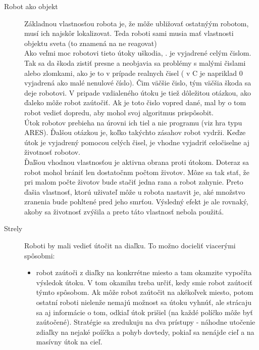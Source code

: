 \begin{description}
\item[Robot ako objekt]\hfill %
Základnou vlastnosťou robota je, že môže ubližovať ostatnýým robotom, musí ich najskôr lokalizovat. Teda roboti sami musia mať vlastnosti objektu sveta (to znamená na ne reagovat) \\ %
Ako veľmi moc robotovi tieto útoky uškodia, . je vyjadrené celým čislom. Tak sa da  škoda zistiť presne a neobjavia sa problémy s malými čislami alebo zlomkami, ako je to v prípade realnych čisel ( v C je napriklad 0 vyjadrená ako malé nenulové číslo). Čim väčšie čislo, tým väčšia škoda sa deje robotovi. V pripade vzdialeného útoku je tiež dôležitou otázkou, ako ďaleko môže robot zaútočiť. Ak je toto čislo vopred dané, mal by o tom robot vedieť dopredu, aby mohol svoj algoritmus prispôsobit.\\
Útok robotov prebieha na úrovni ich tiel a nie programu (viz hra typu ARES). Ďalšou  otázkou je, koľko takýchto zásahov robot vydrži. Keďze útok je vyjadrený pomocou celých čisel,  je vhodne vyjadriť celočiselne  aj životnosť robotov.\\
Ďaľšou vhodnou vlastnosťou je aktivna obrana proti útokom. Doteraz sa robot mohol brániť len dostatočnm počtom životov. Môze sa tak stať, že pri malom počte životov bude stačiť jedna rana a robot zahynie. Preto ďašia vlastnosť, ktorú uživateľ môže u robota nastavit je, aké množstvo zranenia bude pohltené pred jeho smrťou. Výsledný efekt je ale rovnaký, akoby sa životnosť zvýšila a preto táto vlastnosť nebola použitá.
\newline
\item[Strely] \hfill %
\newline %
Roboti by mali vedieť útočit na diaľku. To možno docieliť viacerými spôsobmi:
\begin{itemize}
\item robot zaútoči z diaľky na konkrrétne miesto a tam okamzite vypočíta výsledok útoku. V tom okamihu treba určiť,  kedy smie robot zaútociť týmto spôsobom. Ak môže robot zaútočit na akékoľvek miesto, potom ostatní roboti nielenže nemajú možnost sa útoku vyhnúť, ale strácaju sa aj informácie o tom, odkiaľ útok prišiel (na každé políčko môže byť zaútočené). Stratégie sa zredukuju na dva prístupy - náhodne utočenie zdiaľky na nejaké poííčka a pohyb dovtedy, pokiaľ sa nenájde cieľ a na masívny útok na cieľ.\\ %

\end{itemize}
\end{description}
